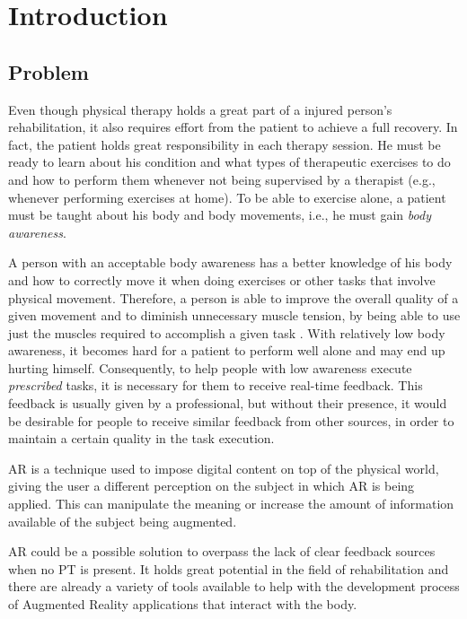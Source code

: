 \chapter{Introduction}
\label{sec:intro}

\section{Problem}


Even though physical therapy holds a great part of a injured person's rehabilitation, 
it also requires effort from the patient to achieve a full recovery.
In fact, the patient holds great responsibility in each therapy session.
He must be ready to learn about his condition and what types of therapeutic exercises 
to do and how to perform them whenever not being supervised by a therapist (e.g., whenever performing exercises at home).
To be able to exercise alone, a patient must be taught about his body and body 
movements, i.e., he must gain \emph{body awareness}.

A person with an acceptable body awareness has a better knowledge of his body and how to correctly move it when doing exercises or other tasks that involve physical movement.
Therefore, a person is able to improve the overall quality of a given movement and to diminish unnecessary muscle tension, 
by being able to use just the muscles required to accomplish a given task \cite{Singh2014a}.
With relatively low body awareness, it becomes hard for a patient to perform well alone and may 
end up hurting himself. %
Consequently, to help people with low awareness 
execute \textit{prescribed} tasks, it is necessary for them to receive real-time feedback.
This feedback is usually given by a professional, 
but without their presence, it would be desirable for people to receive similar feedback from other sources, in order to maintain a certain quality in the task execution.

\ac{AR} is a technique used to impose digital content on top of the physical world,
giving the user a different perception on the subject in which \ac{AR} is being
applied. This can manipulate the meaning or increase the amount of information available
of the subject being augmented.

\ac{AR} could be a possible solution to overpass the lack of clear feedback sources when no \ac{PT} is present.
It holds great potential in the field of rehabilitation %
and there are already a variety of tools available to help with the development process of Augmented
Reality applications that interact with the body\cite{Gama2012a}.

